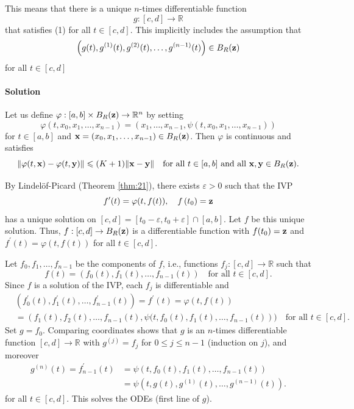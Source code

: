 \documentclass[a4paper]{article}
\begin{document}
\begin{note}
    This means that there is a unique $n$-times differentiable function
    \[
    g:[c, d] \rightarrow \mathbb{R}
    \]
    that satisfies (1) for all $t \in[c, d]$. This implicitly includes the assumption that
    \[
    \left(g(t), g^{(1)}(t), g^{(2)}(t), \ldots, g^{(n-1)}(t)\right) \in B_R({\bf z})
    \]
    for all $t \in[c, d]$
\end{note}
\paragraph{Solution} Let us define $\varphi:[a, b] \times B_R({\bf z}) \rightarrow \mathbb{R}^n$ by setting
\[
\varphi\left(t, x_0, x_1, \ldots, x_{n-1}\right)=\left(x_1, \ldots, x_{n-1}, \psi\left(t, x_0, x_1, \ldots, x_{n-1}\right)\right)
\]
for $t \in[a, b]$ and ${\bf x}=\left(x_0, x_1, \ldots, x_{n-1}\right) \in B_R({\bf z})$. Then $\varphi$ is continuous and satisfies 
\[
    \|\varphi(t, {\bf x})-\varphi(t, {\bf y})\| \leqslant(K+1)\|{\bf x}-{\bf y}\| \quad \text{for all } t \in[a, b] \text{ and all } {\bf x}, {\bf y} \in B_R({\bf z}).
\]

By Lindelöf-Picard (Theorem \ref{thm:21}), there exists $\varepsilon>0$ such that the IVP
\[
    f^{\prime}(t)=\varphi(t, f(t)), \quad f\left(t_0\right)={\bf z}
\]
has a unique solution on $[c, d]=\left[t_0-\varepsilon, t_0+\varepsilon\right] \cap[a, b]$. Let $f$ be this unique solution. 
Thus, $f:[c, d] \rightarrow B_R({\bf z})$ is a differentiable function with $f(t_0)={\bf z}$ and $f^{\prime}(t)=\varphi(t, f(t))$ for all $t \in[c, d]$. 

Let $f_0, f_1, \ldots, f_{n-1}$ be the components of $f$, i.e., functions $f_j:[c, d] \rightarrow \mathbb{R}$ such that
\[
    f(t)=\left(f_0(t), f_1(t), \ldots, f_{n-1}(t)\right) \quad \text{for all } t \in[c, d].
\]
Since $f$ is a solution of the IVP, each $f_j$ is differentiable and
\begin{align*}
    &\left(f_0^{\prime}(t), f_1^{\prime}(t), \ldots, f_{n-1}^{\prime}(t)\right)=f^{\prime}(t)=\varphi(t, f(t)) \\
    &=\left(f_1(t), f_2(t), \ldots, f_{n-1}(t), \psi(t, f_0(t), f_1(t), \ldots, f_{n-1}(t)\right))\quad \text{for all }t\in [c,d].
\end{align*}
Set $g=f_0$. Comparing coordinates shows that $g$ is an $n$-times differentiable function $[c, d] \rightarrow \mathbb{R}$ with $g^{(j)}=f_j$ for $0 \leqslant j\le n-1$ (induction on $j$), and moreover
\begin{align*}
    g^{(n)}(t)=f_{n-1}^{\prime}(t)&=\psi\left(t, f_0(t), f_1(t), \ldots, f_{n-1}(t)\right) \\
&=\psi\left(t, g(t), g^{(1)}(t), \ldots, g^{(n-1)}(t)\right).
\end{align*}
for all $t \in[c, d]$. This solves the ODEs (first line of $g$).
\end{document}
